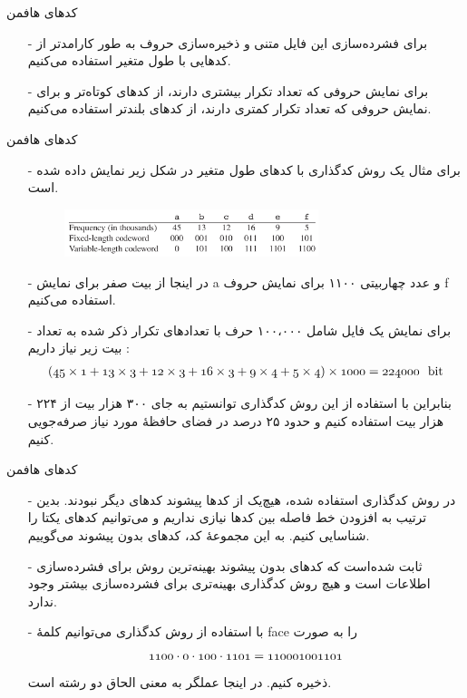 \begin{frame}{‌کدهای هافمن}
\begin{itemize}\itemr
\item[-]
برای فشرده‌سازی این فایل متنی و ذخیره‌سازی حروف به طور کارامدتر از کدهایی با طول متغیر
استفاده می‌کنیم.
\item[-]
برای نمایش حروفی که تعداد تکرار بیشتری دارند، از کدهای کوتاه‌تر و برای نمایش حروفی که تعداد تکرار کمتری دارند، از کدهای بلندتر استفاده می‌کنیم.
\end{itemize}
\end{frame}


\begin{frame}{‌کدهای هافمن}
\begin{itemize}\itemr
\item[-]
برای مثال یک روش کدگذاری با کدهای طول متغیر در شکل زیر نمایش داده شده است.
\begin{figure}
\includegraphics[width=0.7\textwidth]{figs/chap05/huffman-vlc}
\end{figure}
\item[-]
در اینجا از بیت صفر برای نمایش a و عدد چهاربیتی
۱۱۰۰
برای نمایش حروف f استفاده می‌کنیم.
\item[-]
برای نمایش یک فایل شامل
۱۰۰،۰۰۰
حرف با تعداد‌های تکرار ذکر شده به تعداد بیت زیر نیاز داریم‌ :
\begin{align*}
\mathnormal{(45 \times 1 + 13 \times 3 + 12 \times 3 + 16 \times 3 + 9 \times 4 + 5 \times 4) \times 1000 = 224000~~\text{bit} }
\end{align*}
\item[-]
بنابراین با استفاده از این روش کدگذاری توانستیم به جای ۳۰۰ هزار بیت از ۲۲۴ هزار بیت استفاده کنیم و حدود ۲۵ درصد در فضای حافظهٔ مورد نیاز صرفه‌جویی کنیم.
\end{itemize}
\end{frame}


\begin{frame}{‌کدهای هافمن}
\begin{itemize}\itemr
\item[-]
در روش کدگذاری استفاده شده، هیچ‌یک از کدها پیشوند کدهای دیگر نبودند. بدین ترتیب به افزودن خط فاصله بین کدها نیازی نداریم و می‌توانیم کدهای یکتا را شناسایی کنیم. به این مجموعهٔ کد، کدهای بدون پیشوند
می‌گوییم.
\item[-]
ثابت شده‌است که کدهای بدون پیشوند بهینه‌ترین روش برای فشرده‌سازی اطلاعات است و هیچ روش کدگذاری بهینه‌تری برای فشرده‌سازی بیشتر وجود ندارد.
\item[-]
با استفاده از روش کدگذاری می‌توانیم کلمهٔ face را به صورت
\begin{align*}
\mathnormal{1100 \cdot 0 \cdot 100 \cdot 1101 = 110001001101}
\end{align*}
ذخیره کنیم. در اینجا عملگر
به معنی الحاق دو رشته است.
\end{itemize}
\end{frame}


